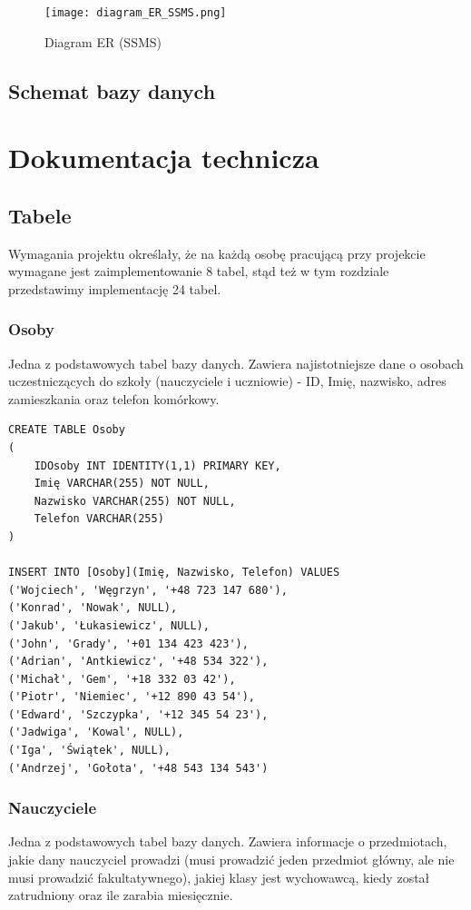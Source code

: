 \documentclass[60pt]{article}
\begin{document}
\begin{figure}[h]
  \texttt{[image: diagram\_ER\_SSMS.png]}
  \caption{Diagram ER (SSMS)}
  \label{Diagram ER (SSMS)}
\end{figure}

\subsection{Schemat bazy danych}

\newpage
\section{Dokumentacja technicza}

\subsection{Tabele}

Wymagania projektu określały, że na każdą osobę pracującą przy projekcie wymagane jest zaimplementowanie 8 tabel, stąd też w tym rozdziale przedstawimy implementację 24 tabel.

\subsubsection{Osoby}
Jedna z podstawowych tabel bazy danych. Zawiera najistotniejsze dane o osobach uczestniczących do szkoły (nauczyciele i uczniowie) - ID, Imię, nazwisko, adres zamieszkania oraz telefon komórkowy.

\begin{verbatim}
CREATE TABLE Osoby
(
    IDOsoby INT IDENTITY(1,1) PRIMARY KEY,
    Imię VARCHAR(255) NOT NULL,
    Nazwisko VARCHAR(255) NOT NULL,
    Telefon VARCHAR(255)
)

INSERT INTO [Osoby](Imię, Nazwisko, Telefon) VALUES
('Wojciech', 'Węgrzyn', '+48 723 147 680'),
('Konrad', 'Nowak', NULL),
('Jakub', 'Łukasiewicz', NULL),
('John', 'Grady', '+01 134 423 423'),
('Adrian', 'Antkiewicz', '+48 534 322'),
('Michał', 'Gem', '+18 332 03 42'),
('Piotr', 'Niemiec', '+12 890 43 54'),
('Edward', 'Szczypka', '+12 345 54 23'),
('Jadwiga', 'Kowal', NULL),
('Iga', 'Świątek', NULL),
('Andrzej', 'Gołota', '+48 543 134 543')
\end{verbatim}

\subsubsection{Nauczyciele}
 Jedna z podstawowych tabel bazy danych. Zawiera informacje o przedmiotach, jakie dany nauczyciel prowadzi (musi prowadzić jeden przedmiot główny, ale nie musi prowadzić fakultatywnego), jakiej klasy jest wychowawcą, kiedy został zatrudniony oraz ile zarabia miesięcznie.
 
\end{document}
